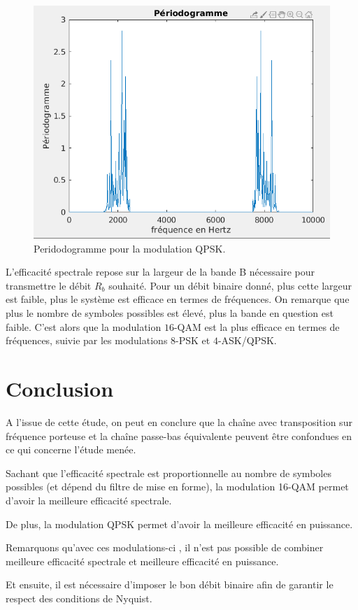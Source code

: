 \documentclass[frenchb]{article}
\begin{document}
\begin{enumerate}
 \begin{figure}[ht!]
    \centering
    \includegraphics[width=12cm]{C3QPSKperio.png}
    \caption{Peridodogramme pour la modulation QPSK.}
    \label{C35}
 \end{figure}
   
\newpage
    \setlength\parindent{0.5cm}
    L'efficacité spectrale repose sur la largeur de la bande B nécessaire pour transmettre le débit $R_b$ souhaité. Pour un débit binaire donné, plus cette largeur est faible, plus le système est efficace en termes de fréquences.
    On remarque que plus le nombre de symboles possibles est élevé, plus la bande en question est faible. C'est alors que la modulation $16$-QAM est la plus efficace en termes de fréquences, suivie par les modulations $8$-PSK et $4$-ASK/QPSK. 
\end{enumerate}

\section{Conclusion}

A l'issue de cette étude, on peut en conclure que la chaîne  avec transposition sur fréquence porteuse et la chaîne passe-bas équivalente peuvent être confondues en ce qui concerne l'étude menée. 

Sachant que l'efficacité spectrale est proportionnelle au  nombre de symboles possibles (et dépend du filtre de mise en forme), la modulation 16-QAM permet d'avoir la meilleure efficacité spectrale. 

De plus, la modulation QPSK permet d'avoir la meilleure efficacité en puissance. 

Remarquons qu'avec ces modulations-ci , il n'est pas possible de combiner meilleure efficacité spectrale et meilleure efficacité en puissance. 

Et ensuite, il est nécessaire d'imposer le bon débit binaire afin de garantir le respect des conditions de Nyquist. 
\end{document}
